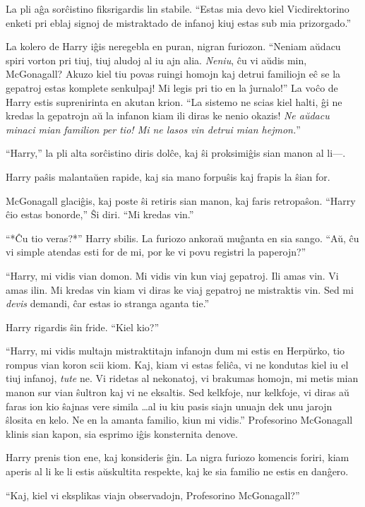 La pli aĝa sorĉistino fiksrigardis lin stabile. ``Estas mia devo
kiel Vicdirektorino enketi pri eblaj signoj de mistraktado de infanoj
kiuj estas sub mia prizorgado.''

La kolero de Harry iĝis neregebla en puran, nigran furiozon. ``Neniam
aŭdacu spiri vorton pri tiuj, tiuj aludoj al iu ajn
alia. \emph{Neniu}, ĉu vi aŭdis min, McGonagall?  Akuzo kiel tiu
povas ruingi homojn kaj detrui familiojn eĉ se la gepatroj estas
komplete senkulpaj! Mi legis pri tio en la ĵurnalo!'' La voĉo de Harry
estis suprenirinta en akutan krion. ``La sistemo ne scias kiel halti, ĝi
ne kredas la gepatrojn aŭ la infanon kiam ili diras ke nenio okazis!
\emph{Ne aŭdacu minaci mian familion per tio! Mi ne lasos vin detrui
mian hejmon.}''

``Harry,'' la pli alta sorĉistino diris dolĉe, kaj ŝi proksimiĝis sian
manon al li—.

Harry paŝis malantaŭen rapide, kaj sia mano forpuŝis kaj frapis la ŝian for.  

McGonagall glaciĝis, kaj poste ŝi retiris sian manon, kaj faris
retropaŝon. ``Harry ĉio estas bonorde,'' Ŝi diri. ``Mi kredas vin.''

``*Ĉu tio veras?*'' Harry sbilis. La furiozo ankoraŭ muĝanta en sia
sango. ``Aŭ, ĉu vi simple atendas esti for de mi, por ke vi povu
registri la paperojn?''

``Harry, mi vidis vian domon. Mi vidis vin kun viaj gepatroj. Ili amas
vin. Vi amas ilin. Mi kredas vin kiam vi diras ke viaj gepatroj ne
mistraktis vin. Sed mi \emph{devis} demandi, ĉar estas io stranga
aganta tie.''

Harry rigardis ŝin fride. ``Kiel kio?''

``Harry, mi vidis multajn mistraktitajn infanojn dum mi estis en
Herpŭrko, tio rompus vian koron scii kiom. Kaj, kiam vi estas feliĉa,
vi ne kondutas kiel iu el tiuj infanoj, \emph{tute} ne. Vi ridetas al
nekonatoj, vi brakumas homojn, mi metis mian manon sur vian ŝultron
kaj vi ne eksaltis. Sed kelkfoje, nur kelkfoje, vi diras aŭ faras ion
kio ŝajnas vere simila \ldots al iu kiu pasis siajn unuajn dek unu
jarojn ŝlosita en kelo. Ne en la amanta familio, kiun mi vidis.''
Profesorino McGonagall klinis sian kapon, sia esprimo iĝis
konsternita denove.

Harry prenis tion ene, kaj konsideris ĝin. La nigra furiozo komencis
foriri, kiam aperis al li ke li estis aŭskultita respekte, kaj ke
sia familio ne estis en danĝero.

``Kaj, kiel vi eksplikas viajn observadojn, Profesorino McGonagall?''

